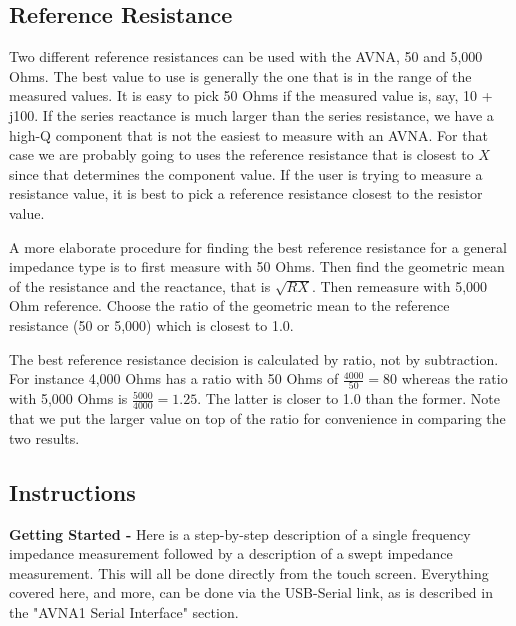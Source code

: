 \subsection{Reference Resistance}Two different reference resistances can be used with the AVNA, 50 and 5,000 Ohms. The best value to use is generally the one that is in the range of the measured values. It is easy to pick 50 Ohms if the measured value is, say, 10 + j100. If the series reactance is much larger than the series resistance, we have a high-Q component that is not the easiest to measure with an AVNA. For that case we are probably going to uses the reference resistance that is closest to \(X\) since that determines the component value. If the user is trying to measure a resistance value, it is best to pick a reference resistance closest to the resistor value.

A more elaborate procedure for finding the best reference resistance for a general impedance type is to first measure with 50 Ohms. Then find the geometric mean of the resistance and the reactance, that is \(\sqrt{R X}\). Then remeasure with 5,000 Ohm reference. Choose the ratio of the geometric mean to the reference resistance (50 or 5,000) which is closest to 1.0.

The best reference resistance decision is calculated by ratio, not by subtraction. For instance 4,000 Ohms has a ratio with 50 Ohms of  \( \frac{4000}{50} = 80\) whereas the ratio with 5,000 Ohms is \( \frac{5000}{4000} = 1.25\). The latter is closer to 1.0 than the former.  Note that we put the larger value on top of the ratio for convenience in comparing the two results.
%
\subsection{Instructions}
\label{subsect:ZInstr}
\textbf{Getting Started - }Here is a step-by-step description of a single frequency impedance measurement followed by a description of a swept impedance measurement. This will all be done directly from the touch screen. Everything covered here, and more, can be done via the USB-Serial link, as is described in the "AVNA1 Serial Interface" section.

